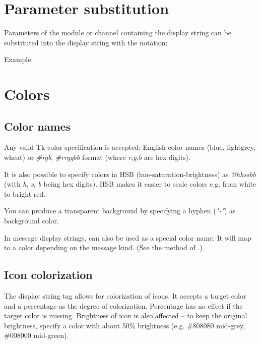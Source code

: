 

\section{Parameter substitution}

Parameters of the module or channel containing the
display string can be substituted into the display string
with the  notation:

Example:


\section{Colors}
\label{sec:ch-graphics:colors}

\subsection{Color names}

Any valid Tk color specification is accepted: English color names
(blue, lightgrey, wheat) or \textit{\#rgb}, \textit{\#rrggbb} format
(where \textit{r},\textit{g},\textit{b} are hex digits).

It is also possible to specify colors in HSB (hue-saturation-brightness) as
\textit{@hhssbb} (with \textit{h}, \textit{s}, \textit{b} being hex digits).
HSB makes it easier to scale colors e.g. from white to bright red.

You can produce a transparent background by specifying a hyphen (\textit{"-"})
as background color.

In message display strings,  can also be used as a special color name.
It will map to a color depending on the message kind.
(See the  method of .)

\subsection{Icon colorization}

The  display string tag allows for colorization of icons.
It accepts a target color and a percentage as the degree of colorization.
Percentage has no effect if the target color is missing.
Brightness of icon is also affected -- to keep the original brightness,
specify a color with about 50\% brightness (e.g. \#808080 mid-grey,
\#008000 mid-green).

